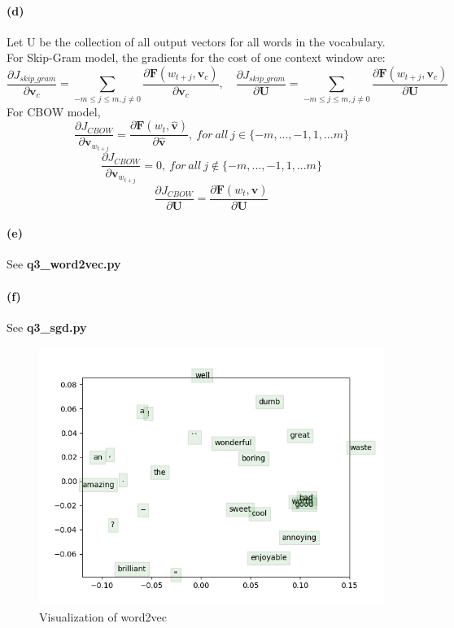 \documentclass{article}
\begin{document}
\begin{spacing}{1.5}
\paragraph{(d)}Let U be the collection of all output vectors for all words in the vocabulary. \\
For Skip-Gram model, the gradients for the cost of one context window are:
\begin{equation}
\frac{\partial J_{skip\_gram}}{\partial \boldsymbol{v}_c}=\sum_{-m\leq j\leq m,j\neq0}\frac{\partial \boldsymbol{F}(w_{t+j},\boldsymbol{v}_c)}{\partial \boldsymbol{v}_c}, \quad 
	 \frac{\partial J_{skip\_gram}}{\partial \boldsymbol{U}}=\sum_{-m\leq j\leq m,j\neq0}\frac{\partial \boldsymbol{F}(w_{t+j},\boldsymbol{v}_c)}{\partial \boldsymbol{U}}  \end{equation}
For CBOW model, 
\begin{equation}
\frac{\partial J_{CBOW}}{\partial \boldsymbol{v}_{w_{t+j}}}=\frac{\partial \boldsymbol{F}(w_{t},\boldsymbol{\widehat{v}})}{\partial \boldsymbol{\widehat{v}}}, \ for\ all\ j\in\{-m,...,-1,1,...m\} 
\end{equation}
\begin{equation}
\frac{\partial J_{CBOW}}{\partial \boldsymbol{v}_{w_{t+j}}}=0, \ for\ all\ j\notin\{-m,...,-1,1,...m\}
\end{equation}
\begin{equation}
\frac{\partial J_{CBOW}}{\partial \boldsymbol{U}}=\frac{\partial \boldsymbol{F}(w_{t},\boldsymbol{\widehat{v}})}{\partial \boldsymbol{U}}
\end{equation}
\paragraph{(e)}See \textbf{q3\_word2vec.py}
\paragraph{(f)}See \textbf{q3\_sgd.py}
\begin{figure}
  \centering
  \includegraphics[width=\textwidth]{q3_word_vectors}
  \caption{Visualization of word2vec}\label{fig:1} 
\end{figure}

\end{spacing}
\end{document}

